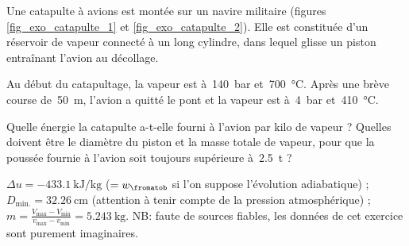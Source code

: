 \begin{Exercise}[title=Catapulte de porte-avions]
Une catapulte à avions est montée sur un navire militaire (figures \ref{fig_exo_catapulte_1} et \ref{fig_exo_catapulte_2}). Elle est constituée d’un réservoir de vapeur connecté à un long cylindre, dans lequel glisse un piston entraînant l’avion au décollage.

	Au début du catapultage, la vapeur est à~\SI{140}{\bar} et~\SI{700}{\degreeCelsius}. Après une brève course de~\SI{50}{\metre}, l’avion a quitté le pont et la vapeur est à~\SI{4}{\bar} et~\SI{410}{\degreeCelsius}.


		\Question Quelle énergie la catapulte a-t-elle fourni à l’avion par kilo de vapeur ?
		\Question Quelles doivent être le diamètre du piston et la masse totale de vapeur, pour que la poussée fournie à l’avion soit toujours supérieure à~\SI{2,5}{\tonne} ?

\end{Exercise}
\begin{Answer}
  \Question $\Delta u = \SI{-433,1}{\kilo\joule\per\kilogram}$ ($=w_\fromatob$ si l’on suppose l’évolution adiabatique) ;
\Question $D_\text{min.} = \SI{32,26}{\centi\metre}$ (attention à tenir compte de la
pression atmosphérique) ;
$m = \frac{V_\text{max} - V_\text{min}}{v_\text{max} - v_\text{min}} = \SI{5,243}{\kilogram}$.
NB: faute de sources fiables, les données de cet exercice sont purement imaginaires.
\end{Answer}
